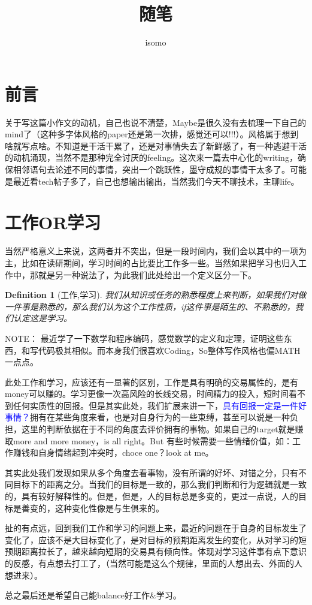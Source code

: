\documentclass{article}
\title{随笔}
\author{isomo}
\newtheorem{definition}{Definition}
\begin{document}
\maketitle

\section{前言}

关于写这篇小作文的动机，自己也说不清楚，Maybe是很久没有去梳理一下自己的mind了（这种多字体风格的paper还是第一次排，感觉还可以!!!）。风格属于想到啥就写点啥。不知道是干活干累了，还是对事情失去了新鲜感了，有一种逃避干活的动机涌现，当然不是那种完全讨厌的feeling。这次来一篇去中心化的writing，确保相邻语句去论述不同的事情，突出一个跳跃性，墨守成规的事情干太多了。可能是最近看tech帖子多了，自己也想输出输出，当然我们今天不聊技术，主聊life。

\section{工作OR学习}

当然严格意义上来说，这两者并不突出，但是一段时间内，我们会以其中的一项为主，比如在读研期间，学习时间的占比要比工作多一些。当然如果把学习也归入工作中，那就是另一种说法了，为此我们此处给出一个定义区分一下。


\begin{definition}[工作,学习]
我们从知识或任务的熟悉程度上来判断，如果我们对做一件事是熟悉的，那么我们认为这个工作性质，if这件事是陌生的、不熟悉的，我们认定这是学习。
\end{definition}

\noindent NOTE： 最近学了一下数学和程序编码，感觉数学的定义和定理，证明这些东西，和写代码极其相似。而本身我们很喜欢Coding，So整体写作风格也偏MATH一点点。

此处工作和学习，应该还有一显著的区别，工作是具有明确的交易属性的，是有money可以赚的。学习更像一次高风险的长线交易，时间精力的投入，短时间看不到任何实质性的回报。但是其实此处，我们扩展来讲一下，\textcolor{blue}{具有回报一定是一件好事情？}拥有在某些角度来看，也是对自身行为的一些束缚，甚至可以说是一种负担，这里的判断依据在于不同的角度去评价拥有的事物。如果自己的target就是赚取more and more money，is all right。But 有些时候需要一些情绪价值，如：工作赚钱和自身情绪起到冲突时，choce one？look at me。

其实此处我们发现如果从多个角度去看事物，没有所谓的好坏、对错之分，只有不同目标下的距离之分。当我们的目标是一致的，那么我们判断和行为逻辑就是一致的，具有较好解释性的。但是，但是，人的目标总是多变的，更过一点说，人的目标是善变的，这种变化性像是与生俱来的。

扯的有点远，回到我们工作和学习的问题上来，最近的问题在于自身的目标发生了变化了，应该不是大目标变化了，是对目标的预期距离发生的变化，从对学习的短预期距离拉长了，越来越向短期的交易具有倾向性。体现对学习这件事有点下意识的反感，有点想去打工了，（当然可能是这么个规律，里面的人想出去、外面的人想进来）。

总之最后还是希望自己能balance好工作\&学习。


% 
% 
\end{document}
